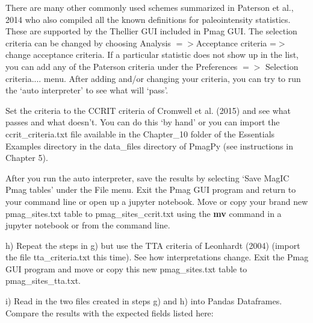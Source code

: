 {{There are many other commonly used schemes summarized in   {Paterson et al., 2014}  \nocite{paterson14}  who also compiled all the known 
definitions for paleointensity statistics.  These are  supported by the Thellier GUI  included in Pmag GUI.    The selection criteria can be changed by choosing  Analysis $=> $Acceptance criteria =$>$change acceptance criteria.   If a particular statistic does not show up in the list, you can add any of the Paterson criteria under the Preferences $=>$ Selection criteria....   menu.   After adding and/or  changing your criteria,  you can try to run the `auto interpreter' to see what will `pass'.    

Set the criteria to the CCRIT criteria of Cromwell et al. (2015) and see what passes and what doesn't.   You can do this `by hand' or you can import the ccrit\_criteria.txt file available in the Chapter\_10 folder of the Essentials Examples directory in the data\_files directory of PmagPy (see instructions in Chapter 5).  

After you run the auto interpreter, save the results by selecting `Save MagIC Pmag tables' under the File menu.   Exit the Pmag GUI program and return to your command line or open up a jupyter notebook.  
Move or copy your brand new  pmag\_sites.txt table to pmag\_sites\_ccrit.txt using the {\bf mv} command in a jupyter notebook or from the command line.  
  
h)  Repeat the steps in g) but use the TTA criteria of Leonhardt (2004) (import the file tta\_criteria.txt this time).   See how  interpretations  change.   Exit the Pmag GUI program and move or copy this  new  pmag\_sites.txt table to pmag\_sites\_tta.txt.  




i)  Read in the two files created in steps g) and h) into Pandas Dataframes.  
Compare the results with the expected fields listed here:  

\nocite{bowles06,donadini07,muxworthy11,pick93,shaar10,shaar11b,tanaka12,yamamoto03,yamamoto08}

}}
